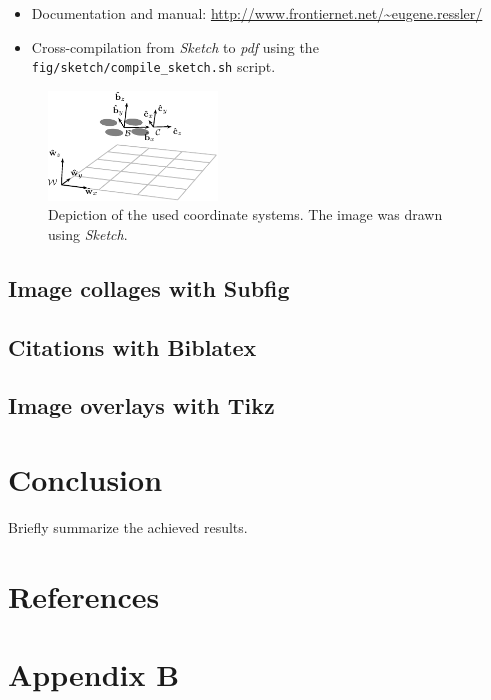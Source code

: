 \begin{itemize}
  \item Documentation and manual: \url{http://www.frontiernet.net/~eugene.ressler/}
  \item Cross-compilation from \emph{Sketch} to \emph{pdf} using the \texttt{fig/sketch/compile\_sketch.sh} script.
\end{itemize}

\begin{figure}[!h]
  \centering
  \includegraphics[width=0.4\textwidth]{./fig/sketch/coordinate_frames.pdf}
  \caption{Depiction of the used coordinate systems. The image was drawn using \emph{Sketch}.}
  \label{fig:coordinate_systems}
\end{figure}

\section{Image collages with Subfig}

\section{Citations with Biblatex}

\section{Image overlays with Tikz}


\chapter{Conclusion\label{chap:conclusion}}

Briefly summarize the achieved results.


\appendix
\renewcommand\chaptername{Appendix}

\chapter{References}

\printbibliography[heading=none,title={}]

\renewcommand{\thechapter}{B}
\renewcommand\chaptername{Appendix B}

\chapter{Appendix B}


